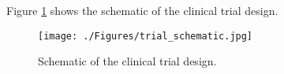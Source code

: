 \documentclass[a4paper]{article}
\begin{document}
	Figure \ref{fig:trial} shows the schematic of the clinical trial design. 
	\begin{figure}[!ht]
		\begin{center}	
			\texttt{[image: ./Figures/trial\_schematic.jpg]} 
		\end{center}
	\caption[Schematic of the clinical trial design]{Schematic of the clinical trial design.}
	\label{fig:trial}
	\end{figure}	
	
\newpage	
\label{Bibliography}


	
\end{document}
